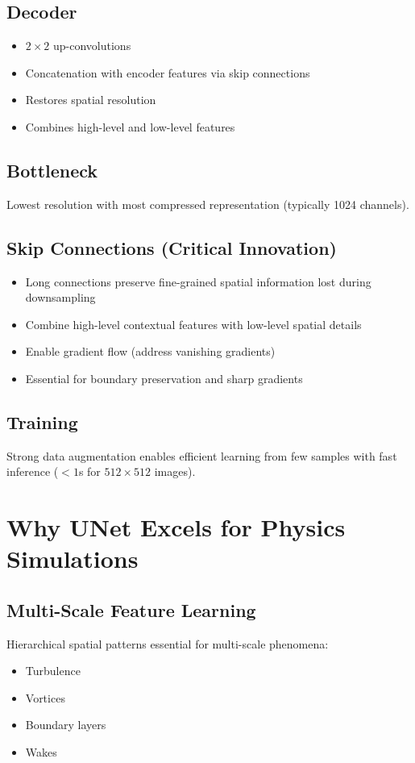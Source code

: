 \subsection{Decoder}
\begin{itemize}
    \item $2 \times 2$ up-convolutions
    \item Concatenation with encoder features via skip connections
    \item Restores spatial resolution
    \item Combines high-level and low-level features
\end{itemize}

\subsection{Bottleneck}
Lowest resolution with most compressed representation (typically 1024 channels).

\subsection{Skip Connections (Critical Innovation)}
\begin{itemize}
    \item Long connections preserve fine-grained spatial information lost during downsampling
    \item Combine high-level contextual features with low-level spatial details
    \item Enable gradient flow (address vanishing gradients)
    \item Essential for boundary preservation and sharp gradients
\end{itemize}

\subsection{Training}
Strong data augmentation enables efficient learning from few samples with fast inference ($<1$s for $512 \times 512$ images).

\section{Why UNet Excels for Physics Simulations}

\subsection{Multi-Scale Feature Learning}
Hierarchical spatial patterns essential for multi-scale phenomena:
\begin{itemize}
    \item Turbulence
    \item Vortices
    \item Boundary layers
    \item Wakes
\end{itemize}

